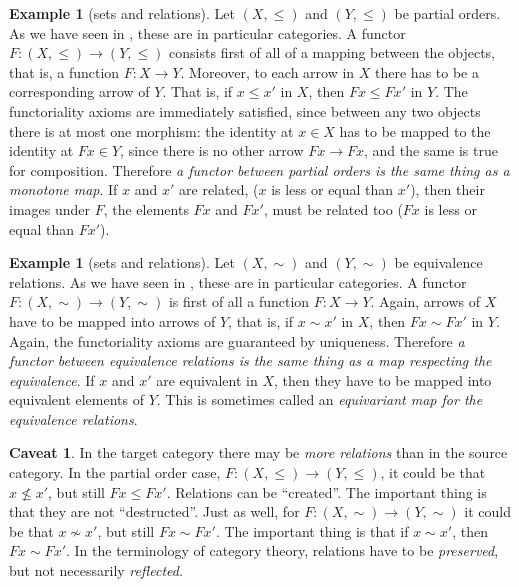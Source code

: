\documentclass[12pt,oneside]{scrbook}
\numberwithin{equation}{section}
\theoremstyle{plain}
\theoremstyle{definition}
\newtheorem{eg}[thm]{Example}
\newtheorem*{caveat}{Caveat}
\DeclareMathOperator{\1}{\mathbbm{1}}
\DeclareMathOperator{\2}{\mathbbm{2}}
\begin{document}
\begin{eg}[sets and relations]
 Let $(X,\le)$ and $(Y,\le)$ be partial orders. As we have seen in , these are in particular categories. A functor $F:(X,\le)\to (Y,\le)$ consists first of all of a mapping between the objects, that is, a function $F:X\to Y$. Moreover, to each arrow in $X$ there has to be a corresponding arrow of $Y$. That is, if $x\le x'$ in $X$, then $Fx \le Fx'$ in $Y$. The functoriality axioms are immediately satisfied, since between any two objects there is at most one morphism: the identity at $x\in X$ has to be mapped to the identity at $Fx\in Y$, since there is no other arrow $Fx\to Fx$, and the same is true for composition. 
 Therefore \emph{a functor between partial orders is the same thing as a monotone map}. If $x$ and $x'$ are related, ($x$ is less or equal than $x'$), then their images under $F$, the elements $Fx$ and $Fx'$, must be related too ($Fx$ is less or equal than $Fx'$). 
\end{eg}

\begin{eg}[sets and relations]\label{equequ}
 Let $(X,\sim)$ and $(Y,\sim)$ be equivalence relations. As we have seen in , these are in particular categories. A functor $F:(X,\sim)\to(Y,\sim)$ is first of all a function $F:X\to Y$. Again, arrows of $X$ have to be mapped into arrows of $Y$, that is, if $x\sim x'$ in $X$, then $Fx \sim Fx'$ in $Y$. Again, the functoriality axioms are guaranteed by uniqueness.
 Therefore \emph{a functor between equivalence relations is the same thing as a map respecting the equivalence}.
 If $x$ and $x'$ are equivalent in $X$, then they have to be mapped into equivalent elements of $Y$. This is sometimes called an \emph{equivariant map for the equivalence relations}. 
\end{eg}

\begin{caveat}
 In the target category there may be \emph{more relations} than in the source category. In the partial order case, $F:(X,\le)\to (Y,\le)$, it could be that $x\nleq x'$, but still $Fx \leq Fx'$. Relations can be ``created''. The important thing is that they are not ``destructed''.
 Just as well, for $F:(X,\sim)\to(Y,\sim)$ it could be that $x\nsim x'$, but still $Fx \sim Fx'$. The important thing is that if $x\sim x'$, then $Fx \sim Fx'$.
 In the terminology of category theory, relations have to be \emph{preserved}, but not necessarily \emph{reflected}. 
\end{caveat}
\end{document}
